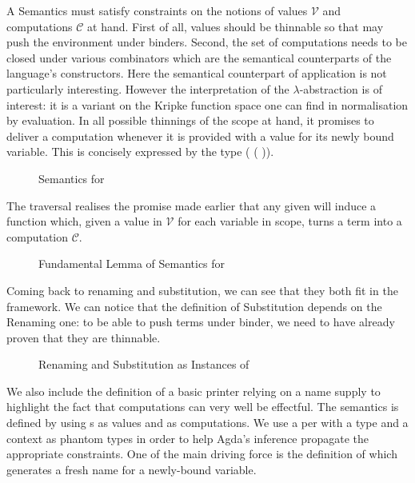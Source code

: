 A Semantics must satisfy constraints on the notions of
values $\mathcal{V}$ and computations $\mathcal{C}$ at hand. First of all,
values should be thinnable so that  may push the environment
under binders. Second, the set of computations needs to be closed
under various combinators which are the semantical counterparts of
the language's constructors. Here the semantical counterpart of
application is not particularly interesting. However the interpretation
of the $\lambda$-abstraction is of interest: it is a variant on
the Kripke function space one can find in normalisation by evaluation.
In all possible thinnings of the scope at hand, it promises to deliver
a computation whenever it is provided with a value for its newly
bound variable. This is concisely expressed by the type
( ( \AB{\sigma}   \AB{\tau})).

\begin{figure}[h]
\caption{Semantics for }
\end{figure}

The traversal  realises the promise made earlier that any given
{  } will induce a function which,
given a value in $\mathcal{V}$ for each variable in scope, turns a term
into a computation $\mathcal{C}$.

\begin{figure}[h]
\caption{Fundamental Lemma of Semantics for }
\end{figure}

Coming back to renaming and substitution, we can see that they both fit
in the  framework. We can notice that the definition of Substitution
depends on the Renaming one: to be able to push terms under binder, we
need to have already proven that they are thinnable.

\begin{figure}[h]
\begin{minipage}{0.45\textwidth}
\end{minipage}
\begin{minipage}{0.45\textwidth}
\end{minipage}
\caption{Renaming and Substitution as Instances of }
\end{figure}

We also include the definition of a basic printer relying on a
name supply to highlight the fact that computations can very well be
effectful. The  semantics is defined by using s
as values and {  } as computations. We use a
per with a type and a context as phantom types in order to
help Agda's inference propagate the appropriate constraints.
One of the main driving force is the definition of  which
generates a fresh name for a newly-bound variable.

